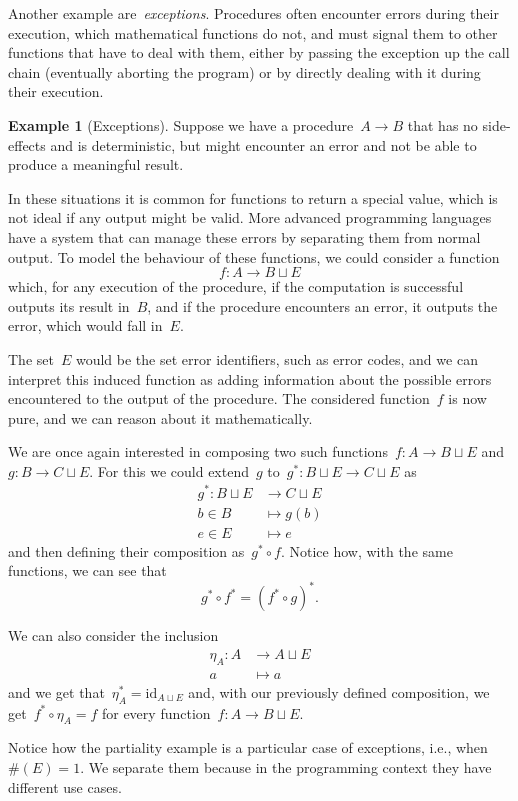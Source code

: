 \documentclass[a4paper]{article}
\theoremstyle{plain}
\theoremstyle{definition}
\newtheorem{example}[theorem]{Example}
\newcommand{\id}{\mathrm{id}}
\newcommand{\ie}{{i}.{e}., }
\begin{document}
Another example are~\emph{exceptions}. Procedures often encounter errors during
their execution, which mathematical functions do not, and must signal them to
other functions that have to deal with them, either by passing the exception up
the call chain (eventually aborting the program) or by directly dealing with it
during their execution.

\begin{example}[Exceptions]
    Suppose we have a procedure~\(A\longrightarrow B\) that has no side-effects
    and is deterministic, but might encounter an error and not be able to
    produce a meaningful result.

    In these situations it is common for functions to return a special value,
    which is not ideal if any output might be valid. More advanced programming
    languages have a system that can manage these errors by separating them from
    normal output. To model the behaviour of these functions, we could consider
    a function
    \[
        f:A\longrightarrow B\sqcup E
    \]
    which, for any execution of the procedure, if the computation is successful
    outputs its result in~\(B\), and if the procedure encounters an error, it
    outputs the error, which would fall in~\(E\).

    The set~\(E\) would be the set error identifiers, such as error codes, and
    we can interpret this induced function as adding information about the
    possible errors encountered to the output of the procedure. The considered
    function~\(f\) is now pure, and we can reason about it mathematically.

    We are once again interested in composing two such
    functions~\(f:A\longrightarrow B\sqcup E\)
    and~\(g:B\longrightarrow C\sqcup E\). For this we could extend~\(g\)
    to~\(g^{\ast}:B\sqcup E\longrightarrow C\sqcup E\) as
    \begin{align*}
        g^{\ast}:B\sqcup E&\longrightarrow C\sqcup E \\
        b\in B&\longmapsto g(b) \\
        e\in E&\longmapsto e
    \end{align*}
    and then defining their composition as~\(g^{\ast}\circ f\). Notice how, with
    the same functions, we can see that
    \[
        g^{\ast} \circ f^{\ast} = (f^{\ast} \circ g)^{\ast}.
    \]

    We can also consider the inclusion
    \begin{align*}
        \eta_{A}:A&\longrightarrow A\sqcup E \\
        a&\longmapsto a
    \end{align*}
    and we get that~\(\eta_{A}^{\ast}=\id_{A\sqcup E}\) and, with our previously
    defined composition, we get~\(f^{\ast}\circ\eta_{A}=f\) for every
    function~\(f:A\longrightarrow B\sqcup E\).
\end{example}
Notice how the partiality example is a particular case of exceptions, \ie
when~\(\#(E) = 1\). We separate them because in the programming context they
have different use cases.
\end{document}
